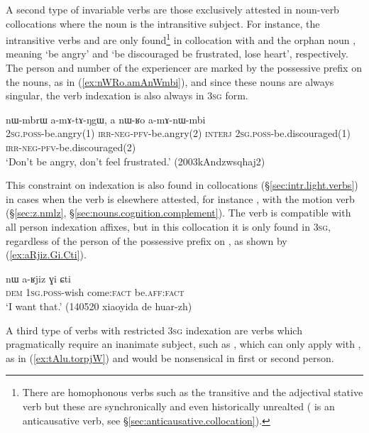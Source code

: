 A second type of invariable verbs are those exclusively attested in noun-verb collocations where the noun is the intransitive subject. For instance, the intransitive verbs  and  are only found\footnote{There are homophonous verbs such as the transitive  and the adjectival stative verb  but these are synchronically and even historically unrealted ( is an anticausative verb, see §\ref{sec:anticausative.collocation}).  } in collocation with  and the orphan noun , meaning `be angry' and `be discouraged be frustrated, lose heart', respectively. The person and number of the experiencer are marked by the possessive prefix on the nouns, as in (\ref{ex:nWRo.amAnWmbi}), and since these nouns are always singular, the verb indexation is also always in \textsc{3sg} form.

\begin{exe}
\ex   \label{ex:nWRo.amAnWmbi}
\gll  nɯ-mbrɯ a-mɤ-tɤ-ŋgɯ, a nɯ-ʁo a-mɤ-nɯ-mbi \\
\textsc{2sg}.\textsc{poss}-be.angry(1) \textsc{irr}-\textsc{neg}-\textsc{pfv}-be.angry(2) \textsc{interj} \textsc{2sg}.\textsc{poss}-be.discouraged(1) \textsc{irr}-\textsc{neg}-\textsc{pfv}-be.discouraged(2)  \\
\glt `Don't be angry, don't feel frustrated.' (2003kAndzwsqhaj2)
\end{exe}

This constraint on indexation is also found in collocations (§\ref{sec:intr.light.verbs}) in cases when the verb is elsewhere attested, for instance , with the motion verb  (§\ref{sec:z.nmlz}, §\ref{sec:nouns.cognition.complement}). The verb  is compatible with all person indexation affixes, but in this collocation it is only found in \textsc{3sg}, regardless of the person of the possessive prefix on , as shown by (\ref{ex:aRjiz.Gi.Cti}).

\begin{exe}
\ex   \label{ex:aRjiz.Gi.Cti}
\gll   nɯ a-ʁjiz ɣi ɕti \\
\textsc{dem} \textsc{1sg}.\textsc{poss}-wish come:\textsc{fact} be.\textsc{aff}:\textsc{fact} \\
\glt `I want that.' (140520 xiaoyida de huar-zh) 
\end{exe}

A third type of verbs with restricted \textsc{3sg} indexation are verbs which pragmatically require an inanimate subject, such as , which can only apply with , as in (\ref{ex:tAlu.torpjW}) and would be nonsensical in first or second person.

